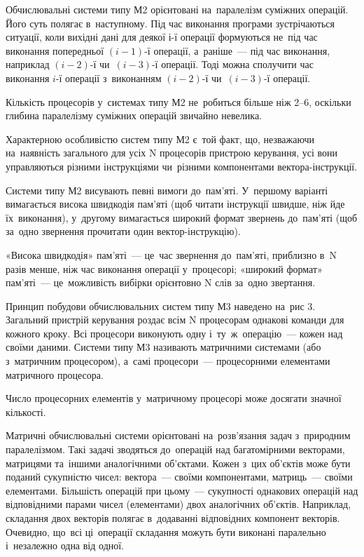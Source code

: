 \documentclass[
	a4paper,
	oneside,
	BCOR = 10mm,
	DIV = 12,
	12pt,
	headings = normal,
]{scrartcl}
\begin{document}
		Обчислювальні системи типу М2 орієнтовані на~паралелізм суміжних операцій. Його суть полягає в~наступному. Під час виконання програми зустрічаються ситуації, коли вихідні дані для деякої і-ї операції формуються не~під час виконання попередньої $(i-1)$-ї операції, а~раніше~— під час виконання, наприклад $(i-2)$-ї чи~$(i-3)$-ї операції. Тоді можна сполучити час виконання $i$-ї операції з~виконанням $(i-2)$-ї чи~$(i-3)$-ї операції.

		Кількість процесорів у~системах типу М2 не~робиться більше ніж 2–6, оскільки глибина паралелізму суміжних операцій звичайно невелика.

		Характерною особливістю систем типу М2 є~той факт, що, незважаючи на~наявність загального для усіх N процесорів пристрою керування, усі вони управляються різними інструкціями чи~різними компонентами вектора-інструкції.

		Системи типу М2 висувають певні вимоги до~пам’яті. У~першому варіанті вимагається висока швидкодія пам’яті (щоб читати інструкції швидше, ніж йде їх~виконання), у~другому вимагається широкий формат звернень до~пам’яті (щоб за~одно звернення прочитати один вектор-інструкцію).

		«Висока швидкодія» пам’яті~— це~час звернення до~пам’яті, приблизно в~N разів менше, ніж час виконання операції у~процесорі; «широкий формат» пам’яті~— це~можливість вибірки орієнтовно N слів за~одно звертання.

		Принцип побудови обчислювальних систем типу М3 наведено на~рис 3. Загальний пристрій керування роздає всім N процесорам однакові команди для кожного кроку. Всі процесори виконують одну і~ту~ж~операцію~— кожен над своїми даними. Системи типу М3 називають матричними системами (або з~матричним процесором), а~самі процесори~— процесорними елементами матричного процесора.

		Число процесорних елементів у~матричному процесорі може досягати значної кількості.

		Матричні обчислювальні системи орієнтовані на~розв’язання задач з~природним паралелізмом. Такі задачі зводяться до~операцій над багатомірними векторами, матрицями та~іншими аналогічними об’єктами. Кожен з~цих об’єктів може бути поданий сукупністю чисел: вектора~— своїми компонентами, матриць~— своїми елементами. Більшість операцій при цьому~— сукупності однакових операцій над відповідними парами чисел (елементами) двох аналогічних об’єктів. Наприклад, складання двох векторів полягає в~додаванні відповідних компонент векторів. Очевидно, що~всі ці~операції складання можуть бути виконані паралельно і~незалежно одна від одної.
\end{document}
